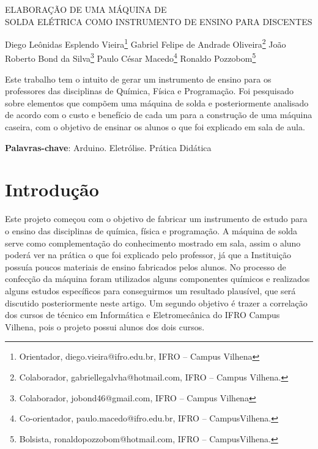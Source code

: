 \documentclass[article,12pt,onesidea,4paper,english,brazil]{abntex2}
\begin{document}
	
	
	\frenchspacing 
	
	\begin{center}
		\LARGE ELABORAÇÃO DE UMA MÁQUINA DE\\SOLDA ELÉTRICA COMO INSTRUMENTO DE ENSINO PARA DISCENTES
		
		\normalsize
		Diego Leônidas Esplendo Vieira\footnote{
			Orientador, diego.vieira@ifro.edu.br, IFRO – Campus Vilhena}
	Gabriel Felipe
	de Andrade Oliveira\footnote{Colaborador, gabriellegalvha@hotmail.com, IFRO – Campus Vilhena.}
	João Roberto
	Bond da Silva\footnote{Colaborador, jobond46@gmail.com, IFRO – Campus Vilhena}
	Paulo César Macedo\footnote{Co-orientador, paulo.macedo@ifro.edu.br, IFRO – CampusVilhena.}
	Ronaldo Pozzobom\footnote{
		Bolsista, ronaldopozzobom@hotmail.com, IFRO – CampusVilhena.}
	
		 
		
	\end{center}


	
	\begin{resumoumacoluna}
	Este trabalho tem o intuito de gerar um instrumento de ensino para os
	professores das disciplinas de Química, Física e Programação. Foi pesquisado
	sobre elementos que compõem uma máquina de solda e posteriormente analisado
	de acordo com o custo e benefício de cada um para a construção de uma máquina
	caseira, com o objetivo de ensinar os alunos o que foi explicado em sala de aula.
	
		\vspace{\onelineskip}
		
		\noindent
		\textbf{Palavras-chave}: Arduino. Eletrólise. Prática Didática
	\end{resumoumacoluna}
	
	\section*{Introdução}
	
	Este projeto começou com o objetivo de fabricar um instrumento de estudo
	para o ensino das disciplinas de química, física e programação. A máquina de solda
	serve como complementação do conhecimento mostrado em sala, assim o aluno
	poderá ver na prática o que foi explicado pelo professor, já que a Instituição possuía
	poucos materiais de ensino fabricados pelos alunos. No processo de confecção da
	máquina foram utilizados alguns componentes químicos e realizados alguns estudos
	específicos para conseguirmos um resultado plausível, que será discutido
	posteriormente neste artigo. Um segundo objetivo é trazer a correlação dos cursos
	de técnico em Informática e Eletromecânica do IFRO Campus Vilhena, pois o projeto
	possui alunos dos dois cursos.
	
\end{document}
